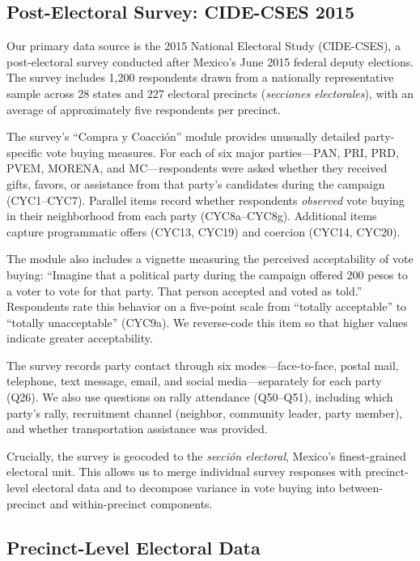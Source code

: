 \documentclass[12pt,letterpaper]{article}
\begin{document}
\subsection{Post-Electoral Survey: CIDE-CSES 2015}

Our primary data source is the 2015 National Electoral Study (CIDE-CSES), a post-electoral survey conducted after Mexico's June 2015 federal deputy elections. The survey includes 1,200 respondents drawn from a nationally representative sample across 28 states and 227 electoral precincts (\textit{secciones electorales}), with an average of approximately five respondents per precinct.

The survey's ``Compra y Coacci\'{o}n'' module provides unusually detailed party-specific vote buying measures. For each of six major parties---PAN, PRI, PRD, PVEM, MORENA, and MC---respondents were asked whether they received gifts, favors, or assistance from that party's candidates during the campaign (CYC1--CYC7). Parallel items record whether respondents \textit{observed} vote buying in their neighborhood from each party (CYC8a--CYC8g). Additional items capture programmatic offers (CYC13, CYC19) and coercion (CYC14, CYC20).

The module also includes a vignette measuring the perceived acceptability of vote buying: ``Imagine that a political party during the campaign offered 200 pesos to a voter to vote for that party. That person accepted and voted as told.'' Respondents rate this behavior on a five-point scale from ``totally acceptable'' to ``totally unacceptable'' (CYC9a). We reverse-code this item so that higher values indicate greater acceptability.

The survey records party contact through six modes---face-to-face, postal mail, telephone, text message, email, and social media---separately for each party (Q26). We also use questions on rally attendance (Q50--Q51), including which party's rally, recruitment channel (neighbor, community leader, party member), and whether transportation assistance was provided.

Crucially, the survey is geocoded to the \textit{secci\'{o}n electoral}, Mexico's finest-grained electoral unit. This allows us to merge individual survey responses with precinct-level electoral data and to decompose variance in vote buying into between-precinct and within-precinct components.

\subsection{Precinct-Level Electoral Data}
\end{document}
